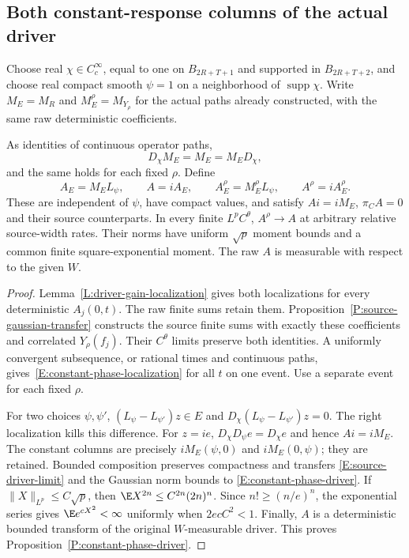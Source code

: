 \subsection{Both constant-response columns of the actual driver}

Choose real $\chi\in C_c^\infty$, equal to one on $B_{2R+T+1}$ and
supported in $B_{2R+T+2}$, and choose real compact smooth $\psi=1$
on a neighborhood of $\operatorname{supp}\chi$.
Write $M_E=M_R$ and $M_E^\rho=M_{Y_\rho}$ for the actual paths already
constructed, with the same raw deterministic coefficients.

\begin{proposition}\label{P:constant-phase-driver}
  As identities of continuous operator paths,
  \begin{equation}\label{E:constant-phase-localization}
    D_\chi M_E=M_E=M_ED_\chi,
  \end{equation}
  and the same holds for each fixed $\rho$. Define
  \begin{equation}\label{E:constant-phase-driver}
    A_E=M_EL_\psi,\qquad A=iA_E,\qquad
    A_E^\rho=M_E^\rho L_\psi,\qquad A^\rho=iA_E^\rho.
  \end{equation}
  These are independent of $\psi$, have compact values, and satisfy
  $Ai=iM_E$, $\pi_CA=0$ and their source counterparts.
  In every finite $L^pC^\theta$, $A^\rho\to A$ at arbitrary relative
  source-width rates. Their norms have uniform $\sqrt p$ moment bounds
  and a common finite square-exponential moment. The raw $A$ is
  measurable with respect to the given $W$.
\end{proposition}

\begin{proof}
  Lemma~\ref{L:driver-gain-localization} gives both localizations for
  every deterministic $A_j(0,t)$. The raw finite sums retain them.
  Proposition~\ref{P:source-gaussian-transfer} constructs the source
  finite sums with exactly these coefficients and correlated
  $Y_\rho(f_j)$. Their $C^\theta$ limits preserve both identities.
  A uniformly convergent subsequence, or rational times and continuous
  paths, gives~\eqref{E:constant-phase-localization} for all $t$ on
  one event. Use a separate event for each fixed $\rho$.

  For two choices $\psi,\psi'$, $(L_\psi-L_{\psi'})z\in E$ and
  $D_\chi(L_\psi-L_{\psi'})z=0$. The right localization kills this
  difference. For $z=ie$, $D_\chi D_\psi e=D_\chi e$ and hence
  $Ai=iM_E$. The constant columns are precisely
  $iM_E(\psi,0)$ and $iM_E(0,\psi)$; they are retained.
  Bounded composition preserves compactness and transfers
  \eqref{E:source-driver-limit} and the Gaussian norm bounds to
  \eqref{E:constant-phase-driver}. If $\|X\|_{L^p}\le C\sqrt p$,
  then $\E X^{2n}\le C^{2n}(2n)^n$. Since $n!\ge(n/e)^n$,
  the exponential series gives $\E e^{cX^2}<\infty$ uniformly when
  $2ecC^2<1$. Finally, $A$ is a deterministic bounded transform of
  the original $W$-measurable driver.
  This proves Proposition~\ref{P:constant-phase-driver}.
\end{proof}

